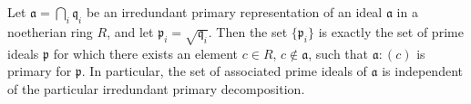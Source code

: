 Let $\mathfrak{a} = \bigcap_i \mathfrak{q}_i$ be an irredundant primary representation of an ideal $\mathfrak{a}$ in a noetherian ring $R$, and let $\mathfrak{p}_i = \sqrt{\mathfrak{q}_i}$. Then the set $\{\mathfrak{p}_i\}$ is exactly the set of prime ideals $\mathfrak{p}$ for which there exists an element $c \in R$, $c \notin \mathfrak{a}$, such that $\mathfrak{a} : (c)$ is primary for $\mathfrak{p}$. In particular, the set of associated prime ideals of $\mathfrak{a}$ is independent of the particular irredundant primary decomposition.
